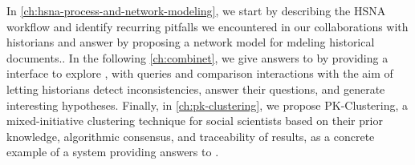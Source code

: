 


In \autoref{ch:hsna-process-and-network-modeling}, we start by describing the HSNA workflow and identify recurring pitfalls we encountered in our collaborations with historians and answer \qone by proposing a network model for mdeling historical documents..
In the following \autoref{ch:combinet}, we give answers to \qtwo by providing a \va interface to explore \modelplural, with queries and comparison interactions with the aim of letting historians detect inconsistencies, answer their questions, and generate interesting hypotheses.
Finally, in \autoref{ch:pk-clustering}, we propose PK-Clustering, a mixed-initiative clustering technique for social scientists based on their prior knowledge, algorithmic consensus, and traceability of results, as a concrete example of a system providing answers to \qthree.



